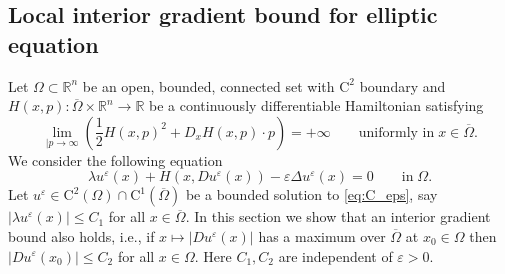 \documentclass[11pt,reqno]{amsart}
\numberwithin{figure}{section}
\theoremstyle{plain}
\theoremstyle{remark}
\numberwithin{equation}{section}
\newcommand{\R}{\mathbb{R}}
\newcommand{\rmC}{\mathrm{C}}
\begin{document}
\subsection{Local interior gradient bound for elliptic equation}
Let $\Omega\subset \R^n$ be an open, bounded, connected set with $\rmC^2$ boundary and $H(x,p):\overline{\Omega}\times \R^n\rightarrow \mathbb{R}$ be a continuously differentiable Hamiltonian satisfying
\begin{equation}\label{eq:grow}
\lim_{|p\rightarrow \infty} \left(\frac{1}{2}H(x,p)^2 + D_xH(x,p)\cdot p\right) = +\infty \qquad\text{uniformly in}\;x\in \overline{\Omega}. \tag{H1}
\end{equation}
We consider the following equation
\begin{equation}\label{eq:C_eps}
    \lambda u^\varepsilon(x) + H(x,Du^\varepsilon(x)) - \varepsilon \Delta u^\varepsilon(x) = 0 \qquad\text{in}\;\Omega.
\end{equation}
Let $u^\varepsilon\in \rmC^2(\Omega)\cap \mathrm{C}^1(\overline{\Omega})$ be a bounded solution to \eqref{eq:C_eps}, say $|\lambda u^\varepsilon(x)| \leq C_1$ for all $x\in \overline{\Omega}$. In this section we show that an interior gradient bound also holds, i.e., if $x\mapsto|Du^\varepsilon(x)|$ has a maximum over $\overline{\Omega}$ at $x_0\in \Omega$ then $|Du^\varepsilon(x_0)| \leq C_2$ for all $x\in \Omega$. Here $C_1,C_2$ are independent of $\varepsilon>0$.\\
\end{document}
